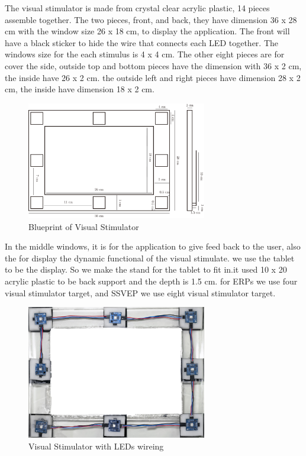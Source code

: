 \hspace{1.5cm}The visual stimulator is made from crystal clear acrylic plastic, 14 pieces assemble together. The two pieces, front, and back, they have dimension 36 x 28 cm with the window size 26 x 18 cm, to display the application. The front will have a black sticker to hide the wire that connects each LED together. The windows size for the each stimulus is 4 x 4 cm. The other eight pieces are for cover the side, outside top and bottom pieces have the dimension with 36 x 2 cm, the inside have 26 x 2 cm. the outside left and right pieces have dimension 28 x 2 cm, the inside have dimension 18 x 2  cm.\\

\begin{figure}[ht]
	\centering
	\includegraphics[width=0.7\textwidth]{chapter6/blueprint.pdf}
	\caption{Blueprint of Visual Stimulator}
\end{figure}
In the middle windows, it is for the application to give feed back to the user, also the for display the dynamic functional of the visual stimulate. we use the tablet to be the display. So we make the stand for the tablet to fit in.it used 10 x 20 acrylic plastic to be back support and the depth is 1.5 cm. for ERPs we use four visual stimulator target, and SSVEP we use eight visual stimulator target. 

\begin{figure}[ht]
	\centering
	\includegraphics[width=0.7\textwidth]{chapter6/frame_LED.jpg}
	\caption{Visual Stimulator with LEDs wireing}
\end{figure}

